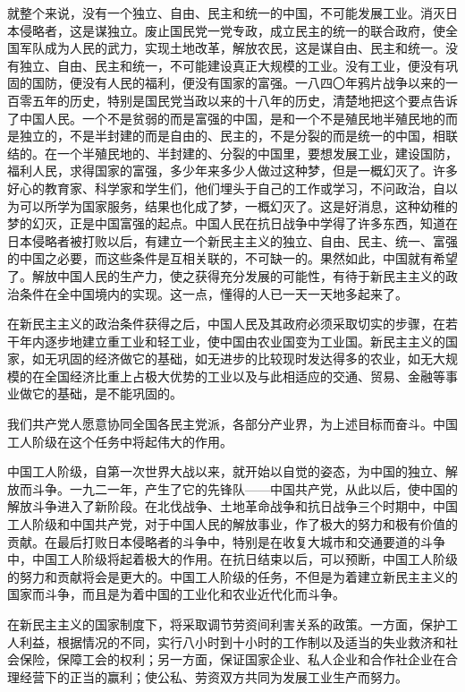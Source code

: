 就整个来说，没有一个独立、自由、民主和统一的中国，不可能发展工业。消灭日本侵略者，这是谋独立。废止国民党一党专政，成立民主的统一的联合政府，使全国军队成为人民的武力，实现土地改革，解放农民，这是谋自由、民主和统一。没有独立、自由、民主和统一，不可能建设真正大规模的工业。没有工业，便没有巩固的国防，便没有人民的福利，便没有国家的富强。一八四〇年鸦片战争以来的一百零五年的历史，特别是国民党当政以来的十八年的历史，清楚地把这个要点告诉了中国人民。一个不是贫弱的而是富强的中国，是和一个不是殖民地半殖民地的而是独立的，不是半封建的而是自由的、民主的，不是分裂的而是统一的中国，相联结的。在一个半殖民地的、半封建的、分裂的中国里，要想发展工业，建设国防，福利人民，求得国家的富强，多少年来多少人做过这种梦，但是一概幻灭了。许多好心的教育家、科学家和学生们，他们埋头于自己的工作或学习，不问政治，自以为可以所学为国家服务，结果也化成了梦，一概幻灭了。这是好消息，这种幼稚的梦的幻灭，正是中国富强的起点。中国人民在抗日战争中学得了许多东西，知道在日本侵略者被打败以后，有建立一个新民主主义的独立、自由、民主、统一、富强的中国之必要，而这些条件是互相关联的，不可缺一的。果然如此，中国就有希望了。解放中国人民的生产力，使之获得充分发展的可能性，有待于新民主主义的政治条件在全中国境内的实现。这一点，懂得的人已一天一天地多起来了。

在新民主主义的政治条件获得之后，中国人民及其政府必须采取切实的步骤，在若干年内逐步地建立重工业和轻工业，使中国由农业国变为工业国。新民主主义的国家，如无巩固的经济做它的基础，如无进步的比较现时发达得多的农业，如无大规模的在全国经济比重上占极大优势的工业以及与此相适应的交通、贸易、金融等事业做它的基础，是不能巩固的。

我们共产党人愿意协同全国各民主党派，各部分产业界，为上述目标而奋斗。中国工人阶级在这个任务中将起伟大的作用。

中国工人阶级，自第一次世界大战以来，就开始以自觉的姿态，为中国的独立、解放而斗争。一九二一年，产生了它的先锋队——中国共产党，从此以后，使中国的解放斗争进入了新阶段。在北伐战争、土地革命战争和抗日战争三个时期中，中国工人阶级和中国共产党，对于中国人民的解放事业，作了极大的努力和极有价值的贡献。在最后打败日本侵略者的斗争中，特别是在收复大城市和交通要道的斗争中，中国工人阶级将起着极大的作用。在抗日结束以后，可以预断，中国工人阶级的努力和贡献将会是更大的。中国工人阶级的任务，不但是为着建立新民主主义的国家而斗争，而且是为着中国的工业化和农业近代化而斗争。

在新民主主义的国家制度下，将采取调节劳资间利害关系的政策。一方面，保护工人利益，根据情况的不同，实行八小时到十小时的工作制以及适当的失业救济和社会保险，保障工会的权利；另一方面，保证国家企业、私人企业和合作社企业在合理经营下的正当的赢利；使公私、劳资双方共同为发展工业生产而努力。

